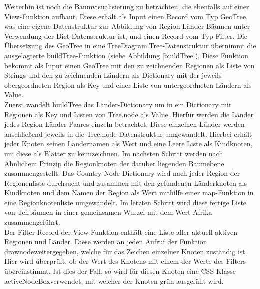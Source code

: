 \documentclass[usegeometry=true]{scrartcl}
\begin{document}
Weiterhin ist noch die Baumvisualisierung zu betrachten, die ebenfalls auf einer View-Funktion aufbaut. Diese erhält als Input einen Record vom Typ GeoTree, was eine eigene Datenstruktur zur Abbildung von Region-Länder-Bäumen unter Verwendung der Dict-Datenstruktur ist, und einen Record vom Typ Filter. Die Übersetzung des GeoTree in eine TreeDiagram.Tree-Datenstruktur übernimmt die ausgelagterte buildTree-Funktion (siehe Abbildung \ref{buildTree}). Diese Funktion bekommt als Input einen GeoTree mit den zu zeichnenden Regionen als Liste von Strings und den zu zeichnenden Ländern als Dictionary mit der jeweils obergeordneten Region als Key und einer Liste von untergeordneten Ländern als Value.\\ Zuerst wandelt buildTree das Länder-Dictionary um in ein Dictionary mit Regionen als Key und Listen von Tree.node als Value. Hierfür werden die Länder jedes Region-Länder-Paares einzeln betrachtet. Diese einzelnen Länder werden anschließend jeweils in die Tree.node Datenstruktur umgewandelt. Hierbei erhält jeder Knoten seinen Ländernamen als Wert und eine Leere Liste als Kindknoten, um diese als Blätter zu kennzeichnen. Im nächsten Schritt werden nach Ähnlichem Prinzip die Regionknoten der darüber liegenden Baumebene zusammengestellt. Das Country-Node-Dictionary wird nach jeder Region der Regionenliste durchsucht und zusammen mit den gefundenen Länderknoten als Kindknoten und dem Namen der Region als Wert mithilfe einer map-Funktion in eine Regionknotenliste umgewandelt. Im letzten Schritt wird diese fertige Liste von Teilbäumen in einer gemeinsamen Wurzel mit dem Wert \glqq Afrika\grqq{} zusammengeführt.\\ Der Filter-Record der View-Funktion enthält eine Liste aller aktuell aktiven Regionen und Länder. Diese werden an jeden Aufruf der Funktion \glqq drawnode\grqq weitergegeben, welche für das Zeichen einzelner Knoten zuständig ist. Hier wird überprüft, ob der Wert des Knotens mit einem der Werte des Filters übereinstimmt. Ist dies der Fall, so wird für diesen Knoten eine CSS-Klasse \glqq activeNodeBox\grqq verwendet, mit welcher der Knoten grün ausgefüllt wird.\\
\end{document}

